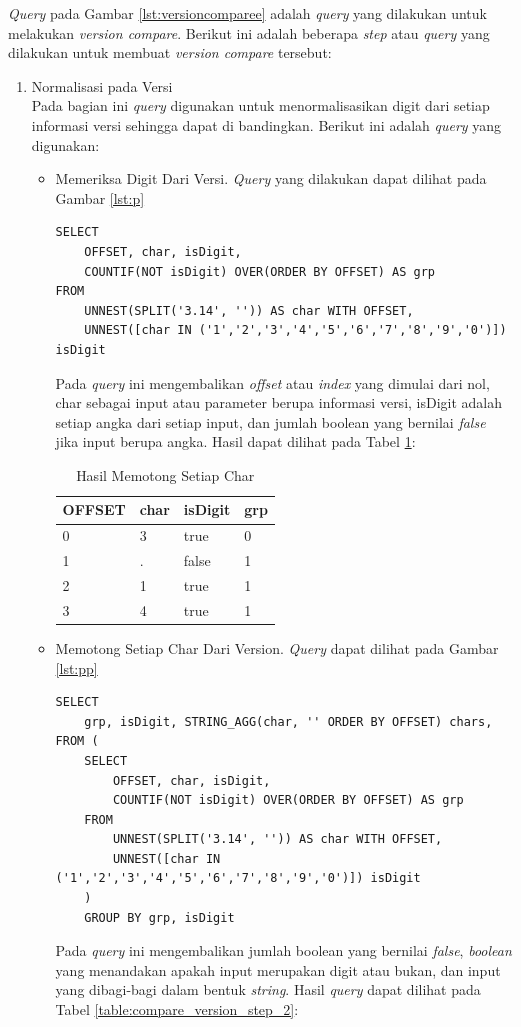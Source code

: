 \textit{Query} pada Gambar \ref{lst:versioncomparee} adalah \textit{query} yang dilakukan untuk melakukan \textit{version compare}. Berikut ini adalah beberapa \textit{step} atau \textit{query} yang dilakukan untuk membuat \textit{version compare} tersebut:
\begin{enumerate}
	\item Normalisasi pada Versi\\
	Pada bagian ini \textit{query} digunakan untuk menormalisasikan digit dari setiap informasi versi sehingga dapat di bandingkan. Berikut ini adalah \textit{query} yang digunakan:
	\begin{itemize}
		\item  Memeriksa Digit Dari Versi. \textit{Query} yang dilakukan dapat dilihat pada Gambar \ref{lst:p}
		\begin{lstlisting}[label={lst:p}, caption={Memeriksa Digit dari Versi}]
SELECT 
	OFFSET, char, isDigit,
	COUNTIF(NOT isDigit) OVER(ORDER BY OFFSET) AS grp
FROM 
	UNNEST(SPLIT('3.14', '')) AS char WITH OFFSET, 
	UNNEST([char IN ('1','2','3','4','5','6','7','8','9','0')]) isDigit
		\end{lstlisting}
		Pada \textit{query} ini mengembalikan \textit{offset} atau \textit{index} yang dimulai dari nol, char sebagai input atau parameter berupa informasi versi, isDigit adalah setiap angka dari setiap input, dan jumlah boolean yang bernilai \textit{false} jika input berupa angka. Hasil dapat dilihat pada Tabel \ref{table:compare_version_step_1}:
		\begin{table}[H]
			\centering
			\begin{tabular}{|l|l|l|l|}
				\hline
				\textbf{OFFSET} & \textbf{char} & \textbf{isDigit} & \textbf{grp}\\
				\hline
				0 & 3 & true & 0\\
				\hline
				1 & . & false & 1\\
				\hline
				2 & 1 & true & 1\\
				\hline
				3 & 4 & true & 1\\
				\hline
			\end{tabular}
			\caption{Hasil Memotong Setiap Char}
			\label{table:compare_version_step_1}
		\end{table}
		
		\item Memotong Setiap Char Dari Version. \textit{Query} dapat dilihat pada Gambar \ref{lst:pp}
		\begin{lstlisting}[label={lst:pp}, caption={Memotong Char dari Setiap Version}]
SELECT 
	grp, isDigit, STRING_AGG(char, '' ORDER BY OFFSET) chars,
FROM (
	SELECT 
		OFFSET, char, isDigit,
		COUNTIF(NOT isDigit) OVER(ORDER BY OFFSET) AS grp
	FROM 
		UNNEST(SPLIT('3.14', '')) AS char WITH OFFSET, 
		UNNEST([char IN ('1','2','3','4','5','6','7','8','9','0')]) isDigit
	)
	GROUP BY grp, isDigit
		\end{lstlisting}
		Pada \textit{query} ini mengembalikan jumlah boolean yang bernilai \textit{false}, \textit{boolean} yang menandakan apakah input merupakan digit atau bukan, dan input yang dibagi-bagi dalam bentuk \textit{string}. Hasil \textit{query} dapat dilihat pada Tabel \ref{table:compare_version_step_2}:


\end{itemize}
\end{enumerate}
